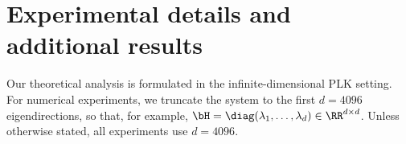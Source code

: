 \documentclass[11pt]{article}
\begin{document}








\section{Experimental details and additional results}
\label{app:experiment}

Our theoretical analysis is formulated in the infinite-dimensional PLK setting. For numerical experiments, we truncate the system to the first \(d=4096\) eigendirections, so that, for example, \(\bH=\diag(\lambda_1,\ldots,\lambda_d)\in\RR^{d\times d}\). Unless otherwise stated, all experiments use \(d=4096\).
\end{document}
